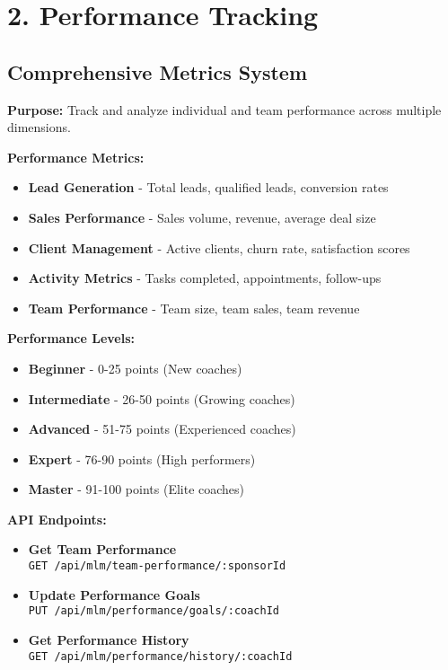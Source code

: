 \documentclass[12pt,a4paper]{article}
\newcommand{\apiendpoint}[2]{\textbf{#1} \\ \texttt{#2}}
\begin{document}
\section{2. Performance Tracking}

\subsection{Comprehensive Metrics System}
\textbf{Purpose:} Track and analyze individual and team performance across multiple dimensions.

\textbf{Performance Metrics:}
\begin{itemize}
    \item \textbf{Lead Generation} - Total leads, qualified leads, conversion rates
    \item \textbf{Sales Performance} - Sales volume, revenue, average deal size
    \item \textbf{Client Management} - Active clients, churn rate, satisfaction scores
    \item \textbf{Activity Metrics} - Tasks completed, appointments, follow-ups
    \item \textbf{Team Performance} - Team size, team sales, team revenue
\end{itemize}

\textbf{Performance Levels:}
\begin{itemize}
    \item \textbf{Beginner} - 0-25 points (New coaches)
    \item \textbf{Intermediate} - 26-50 points (Growing coaches)
    \item \textbf{Advanced} - 51-75 points (Experienced coaches)
    \item \textbf{Expert} - 76-90 points (High performers)
    \item \textbf{Master} - 91-100 points (Elite coaches)
\end{itemize}

\textbf{API Endpoints:}
\begin{itemize}
    \item \apiendpoint{Get Team Performance}{GET /api/mlm/team-performance/:sponsorId}
    \item \apiendpoint{Update Performance Goals}{PUT /api/mlm/performance/goals/:coachId}
    \item \apiendpoint{Get Performance History}{GET /api/mlm/performance/history/:coachId}
\end{itemize}
\end{document}
